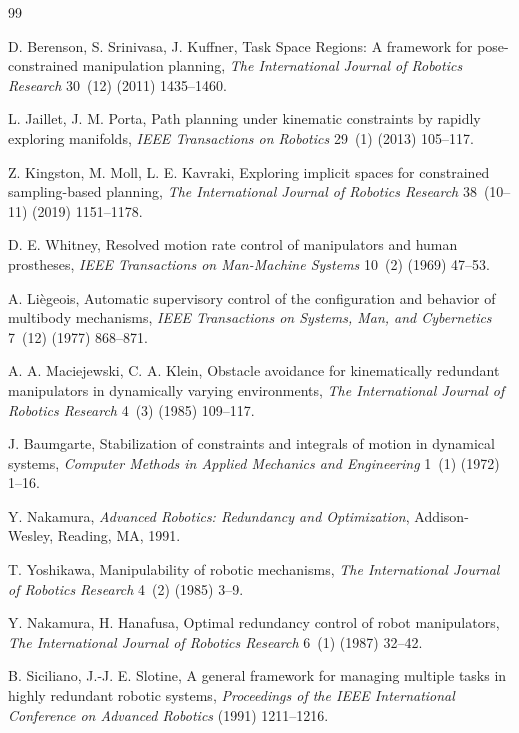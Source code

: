 \documentclass[preprint,12pt]{elsarticle}
\begin{document}
\begin{thebibliography}{99}

D. Berenson, S. Srinivasa, J. Kuffner,
Task Space Regions: A framework for pose-constrained manipulation planning,
\textit{The International Journal of Robotics Research} 30~(12) (2011) 1435--1460.

L. Jaillet, J. M. Porta,
Path planning under kinematic constraints by rapidly exploring manifolds,
\textit{IEEE Transactions on Robotics} 29~(1) (2013) 105--117.

Z. Kingston, M. Moll, L. E. Kavraki,
Exploring implicit spaces for constrained sampling-based planning,
\textit{The International Journal of Robotics Research} 38~(10--11) (2019) 1151--1178.

D. E. Whitney,
Resolved motion rate control of manipulators and human prostheses,
\textit{IEEE Transactions on Man-Machine Systems} 10~(2) (1969) 47--53.

A. Li\`egeois,
Automatic supervisory control of the configuration and behavior of multibody mechanisms,
\textit{IEEE Transactions on Systems, Man, and Cybernetics} 7~(12) (1977) 868--871.

A. A. Maciejewski, C. A. Klein,
Obstacle avoidance for kinematically redundant manipulators in dynamically varying environments,
\textit{The International Journal of Robotics Research} 4~(3) (1985) 109--117.

J. Baumgarte,
Stabilization of constraints and integrals of motion in dynamical systems,
\textit{Computer Methods in Applied Mechanics and Engineering} 1~(1) (1972) 1--16.

Y. Nakamura,
\textit{Advanced Robotics: Redundancy and Optimization},
Addison-Wesley, Reading, MA, 1991.

T. Yoshikawa,
Manipulability of robotic mechanisms,
\textit{The International Journal of Robotics Research} 4~(2) (1985) 3--9.

Y. Nakamura, H. Hanafusa,
Optimal redundancy control of robot manipulators,
\textit{The International Journal of Robotics Research} 6~(1) (1987) 32--42.

B. Siciliano, J.-J. E. Slotine,
A general framework for managing multiple tasks in highly redundant robotic systems,
\textit{Proceedings of the IEEE International Conference on Advanced Robotics} (1991) 1211--1216.


\end{thebibliography}
\end{document}
